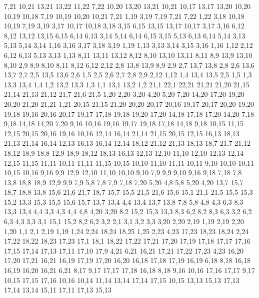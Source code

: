 7,21
10,21
13,21
13,22
11,22
7,22
%
10,20
13,20
13,21
10,21
%
10,17
13,17
13,20
10,20
10,19
10,18
%
7,19
10,19
10,20
10,21
7,21
%
1,19
3,19
7,19
7,21
7,22
1,22
%
3,18
10,18
10,19
7,19
3,19
%
3,17
10,17
10,18
3,18
%
3,15
6,15
13,15
13,17
10,17
3,17
3,16
%
6,12
8,12
13,12
13,15
6,15
6,14
6,13
%
3,14
5,14
6,14
6,15
3,15
%
5,13
6,13
6,14
5,14
%
3,13
5,13
5,14
3,14
%
1,16
3,16
3,17
3,18
3,19
1,19
%
1,13
3,13
3,14
3,15
3,16
1,16
%
1,12
2,12
6,12
6,13
5,13
3,13
1,13
%
8,11
13,11
13,12
8,12
%
8,10
13,10
13,11
8,11
%
8,9
13,9
13,10
8,10
%
2,9
8,9
8,10
8,11
8,12
6,12
2,12
%
2,8
13,8
13,9
8,9
2,9
%
2,7
13,7
13,8
2,8
%
2,6
13,6
13,7
2,7
%
2,5
13,5
13,6
2,6
%
1,5
2,5
2,6
2,7
2,8
2,9
2,12
1,12
%
1,4
13,4
13,5
2,5
1,5
%
1,3
13,3
13,4
1,4
%
1,2
13,2
13,3
1,3
%
1,1
13,1
13,2
1,2
21,1
22,1
22,21
21,21
21,20
21,15
21,14
21,13
21,12
21,7
21,6
21,5
%
1,20
2,20
3,20
4,20
5,20
7,20
14,20
17,20
19,20
20,20
21,20
21,21
1,21
%
20,15
21,15
21,20
20,20
20,17
20,16
%
19,17
20,17
20,20
19,20
19,18
%
19,16
20,16
20,17
19,17
%
17,18
19,18
19,20
17,20
%
14,18
17,18
17,20
14,20
%
7,18
9,18
14,18
14,20
7,20
%
9,16
10,16
19,16
19,17
19,18
17,18
14,18
9,18
%
10,15
11,15
12,15
20,15
20,16
19,16
10,16
%
12,14
16,14
21,14
21,15
20,15
12,15
%
16,13
18,13
21,13
21,14
16,14
%
12,13
16,13
16,14
12,14
%
18,12
21,12
21,13
18,13
%
18,7
21,7
21,12
18,12
18,9
18,8
%
12,9
18,9
18,12
18,13
16,13
12,13
12,10
%
11,10
12,10
12,13
12,14
12,15
11,15
11,11
%
10,11
11,11
11,15
10,15
%
10,10
11,10
11,11
10,11
%
9,10
10,10
10,11
10,15
10,16
9,16
%
9,9
12,9
12,10
11,10
10,10
9,10
%
7,9
9,9
9,10
9,16
9,18
7,18
%
7,8
13,8
18,8
18,9
12,9
9,9
7,9
%
5,8
7,8
7,9
7,18
7,20
5,20
%
4,8
5,8
5,20
4,20
%
13,7
15,7
18,7
18,8
13,8
%
15,6
21,6
21,7
18,7
15,7
%
15,5
21,5
21,6
15,6
%
15,1
21,1
21,5
15,5
15,3
15,2
%
13,3
15,3
15,5
15,6
15,7
13,7
13,4
%
4,4
13,4
13,7
13,8
7,8
5,8
4,8
%
4,3
6,3
8,3
13,3
13,4
4,4
%
3,3
4,3
4,4
4,8
4,20
3,20
%
8,2
15,2
15,3
13,3
8,3
%
6,2
8,2
8,3
6,3
%
3,2
6,2
6,3
4,3
3,3
%
3,1
15,1
15,2
8,2
6,2
3,2
%
2,1
3,1
3,2
3,3
3,20
2,20
2,19
%
1,19
2,19
2,20
1,20
%
1,1
2,1
2,19
1,19
1,24
2,24
18,24
18,25
1,25
%
2,23
4,23
17,23
18,23
18,24
2,24
%
17,22
18,22
18,23
17,23
%
17,1
18,1
18,22
17,22
17,21
17,20
17,19
17,18
17,17
17,16
17,15
17,14
17,13
17,11
17,10
17,9
%
4,21
6,21
16,21
17,21
17,22
17,23
4,23
%
16,20
17,20
17,21
16,21
%
16,19
17,19
17,20
16,20
%
16,18
17,18
17,19
16,19
%
6,18
8,18
16,18
16,19
16,20
16,21
6,21
%
8,17
9,17
17,17
17,18
16,18
8,18
%
9,16
10,16
17,16
17,17
9,17
%
10,15
17,15
17,16
10,16
%
10,14
11,14
13,14
17,14
17,15
10,15
%
13,13
15,13
17,13
17,14
13,14
%
15,11
17,11
17,13
15,13
